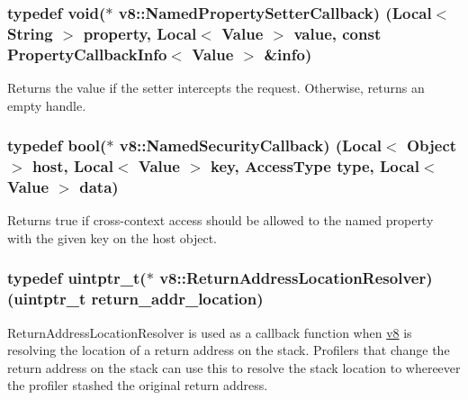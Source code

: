 \subsubsection[{\texorpdfstring{Named\+Property\+Setter\+Callback}{NamedPropertySetterCallback}}]{\setlength{\rightskip}{0pt plus 5cm}typedef void($\ast$ v8\+::\+Named\+Property\+Setter\+Callback) ({\bf Local}$<$ {\bf String} $>$ property, {\bf Local}$<$ {\bf Value} $>$ value, const {\bf Property\+Callback\+Info}$<$ {\bf Value} $>$ \&info)}\hypertarget{namespacev8_a9587769513971dc7cb301b740d9e66b6}{}\label{namespacev8_a9587769513971dc7cb301b740d9e66b6}
Returns the value if the setter intercepts the request. Otherwise, returns an empty handle. 
\subsubsection[{\texorpdfstring{Named\+Security\+Callback}{NamedSecurityCallback}}]{\setlength{\rightskip}{0pt plus 5cm}typedef bool($\ast$ v8\+::\+Named\+Security\+Callback) ({\bf Local}$<$ {\bf Object} $>$ host, {\bf Local}$<$ {\bf Value} $>$ key, {\bf Access\+Type} type, {\bf Local}$<$ {\bf Value} $>$ data)}\hypertarget{namespacev8_ab5cafda0c556bba990c660ce9c904e0d}{}\label{namespacev8_ab5cafda0c556bba990c660ce9c904e0d}
Returns true if cross-\/context access should be allowed to the named property with the given key on the host object. 
\subsubsection[{\texorpdfstring{Return\+Address\+Location\+Resolver}{ReturnAddressLocationResolver}}]{\setlength{\rightskip}{0pt plus 5cm}typedef uintptr\+\_\+t($\ast$ v8\+::\+Return\+Address\+Location\+Resolver) (uintptr\+\_\+t return\+\_\+addr\+\_\+location)}\hypertarget{namespacev8_a8ce54c75241be41ff6a25e9944eefd2a}{}\label{namespacev8_a8ce54c75241be41ff6a25e9944eefd2a}
Return\+Address\+Location\+Resolver is used as a callback function when \hyperlink{namespacev8}{v8} is resolving the location of a return address on the stack. Profilers that change the return address on the stack can use this to resolve the stack location to whereever the profiler stashed the original return address.


